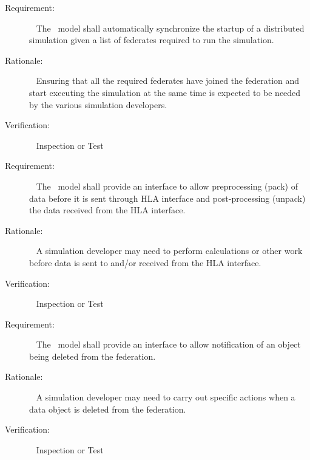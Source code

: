 \documentclass[twoside,11pt,titlepage]{report}
\begin{document}
\label{reqt:automatic_sim_startup}
\begin{description}
  \item[Requirement:]\ \newline
    The \TrickHLA\ model shall automatically synchronize the startup
    of a distributed simulation given a list of federates required to
    run the simulation.

  \item[Rationale:]\ \newline
    Ensuring that all the required federates have joined the federation
    and start executing the simulation at the same time is expected to be
    needed by the various simulation developers.

  \item[Verification:]\ \newline
    Inspection or Test
\end{description}


\label{reqt:pack_unpack}
\begin{description}
  \item[Requirement:]\ \newline
    The \TrickHLA\ model shall provide an interface to allow preprocessing
    (pack) of data before it is sent through HLA interface and post-processing 
    (unpack) the data received from the HLA interface.

  \item[Rationale:]\ \newline
    A simulation developer may need to perform calculations or other work 
    before data is sent to and/or received from the HLA interface.

  \item[Verification:]\ \newline
    Inspection or Test
\end{description}


\label{reqt:object_deletion}
\begin{description}
  \item[Requirement:]\ \newline
    The \TrickHLA\ model shall provide an interface to allow notification of 
    an object being deleted from the federation.

  \item[Rationale:]\ \newline
    A simulation developer may need to carry out specific actions when a data 
    object is deleted from the federation.

  \item[Verification:]\ \newline
    Inspection or Test
\end{description}
\end{document}
